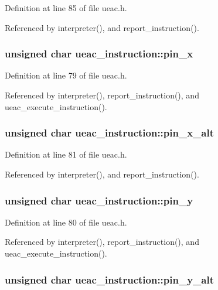 Definition at line 85 of file ueac.h.

Referenced by interpreter(), and report\_\-instruction().
\subsubsection{\setlength{\rightskip}{0pt plus 5cm}unsigned char {\bf ueac\_\-instruction::pin\_\-x}}\label{structueac__instruction_o3}




Definition at line 79 of file ueac.h.

Referenced by interpreter(), report\_\-instruction(), and ueac\_\-execute\_\-instruction().
\subsubsection{\setlength{\rightskip}{0pt plus 5cm}unsigned char {\bf ueac\_\-instruction::pin\_\-x\_\-alt}}\label{structueac__instruction_o5}




Definition at line 81 of file ueac.h.

Referenced by interpreter(), and report\_\-instruction().
\subsubsection{\setlength{\rightskip}{0pt plus 5cm}unsigned char {\bf ueac\_\-instruction::pin\_\-y}}\label{structueac__instruction_o4}




Definition at line 80 of file ueac.h.

Referenced by interpreter(), report\_\-instruction(), and ueac\_\-execute\_\-instruction().
\subsubsection{\setlength{\rightskip}{0pt plus 5cm}unsigned char {\bf ueac\_\-instruction::pin\_\-y\_\-alt}}\label{structueac__instruction_o6}




